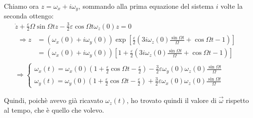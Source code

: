\documentclass[../main.tex]{subfiles}
\begin{document}
Chiamo ora $z=\omega_x+i \omega_y$, sommando alla prima equazione del sistema $i$ volte la seconda ottengo:
\begin{gather*}
	\dot z+\frac{\varepsilon}2 \Omega \sin\Omega t z - \frac 32 \varepsilon\cos\Omega t \omega_z(0)z=0\\
	\begin{split}
	\Longrightarrow z&=(\omega_x(0)+i\omega_y(0))\exp\left[\frac\varepsilon 2 \left(3i\omega_z(0)\frac{\sin\Omega t}{\Omega}+\cos\Omega t -1\right)\right]\\
	&=(\omega_x(0)+i\omega_y(0))\left[1+\frac\varepsilon 2 \left(3i\omega_z(0)\frac{\sin\Omega t}{\Omega}+\cos\Omega t -1\right)\right]
	\end{split}\\
	\Longrightarrow 
	\begin{cases}
		\omega_x(t)=\omega_x(0)\left( 1+\frac \varepsilon 2 \cos\Omega t -\frac\varepsilon 2 \right) - \frac 32 \varepsilon \omega_y(0)\omega_z(0)\frac{\sin \Omega t}{\Omega}\\
		\omega_y(t)=\omega_y(0)\left( 1+\frac \varepsilon 2 \cos\Omega t -\frac\varepsilon 2 \right) + \frac 32 \varepsilon \omega_x(0)\omega_z(0)\frac{\sin \Omega t}{\Omega}
	\end{cases}
\end{gather*}

Quindi, poichè avevo già ricavato $\omega_z(t)$, ho trovato quindi il valore di $\vec\omega$ rispetto al tempo, che è quello che volevo.

\solution[2]
\end{document}
